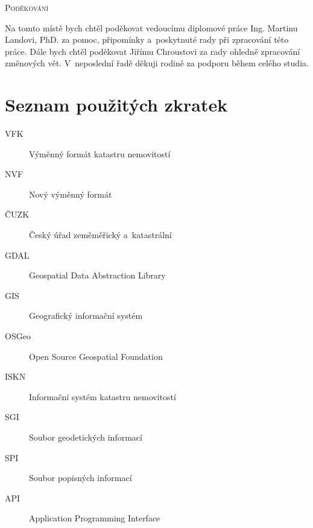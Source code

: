 \documentclass[a4paper,12pt,oneside]{book}
\begin{document}
\clearpage
\vspace*{\fill}

\noindent
\textsc{\Large Poděkování}

\vspace{12pt} Na tomto místě bych chtěl poděkovat vedoucímu diplomové
práce Ing. Martinu Landovi, PhD. za pomoc, připomínky a~poskytnuté
rady při zpracování této práce. Dále bych chtěl poděkovat Jiřímu
Chroustovi za rady ohledně zpracování změnových vět. V~neposlední řadě
děkuji rodině za podporu během celého studia.  \vspace{2cm}

\clearpage
\chapter*{Seznam použitých zkratek}
\thispagestyle{empty}

\begin{description}
\item[VFK] Výměnný formát katastru nemovitostí
\item[NVF] Nový výměnný formát
\item[ČUZK] Český úřad zeměměřický a~katastrální
\item[GDAL] Geospatial Data Abstraction Library
\item[GIS] Geografický informační systém
\item[OSGeo] Open Source Geospatial Foundation
\item[ISKN] Informační systém katastru nemovitostí
\item[SGI] Soubor geodetických informací
\item[SPI] Soubor popisných informací
\item[API] Application Programming Interface
\end{description}


\clearpage
\rhead{{\rightmark}}		%
\tableofcontents
\thispagestyle{empty}

\clearpage
\pagestyle{fancy}		%
\setcounter{page}{1}   	%
\end{document}
